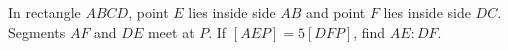 In rectangle $ABCD$, point $E$ lies inside side $AB$ and point $F$ lies inside side $DC$. Segments $AF$ and $DE$ meet at $P$. If $[AEP]=5[DFP]$, find $AE:DF$.
